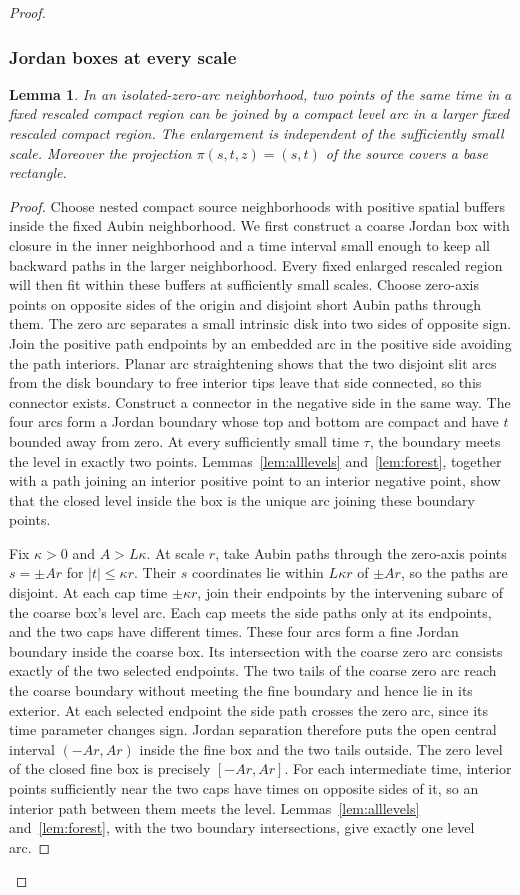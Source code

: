 \documentclass[11pt]{article}
\newtheorem{lemma}[theorem]{Lemma}
\begin{document}
\begin{proof}
\subsubsection{Jordan boxes at every scale}
\begin{lemma}\label{lem:levelboxes}
In an isolated-zero-arc neighborhood, two points of the same time in a fixed rescaled compact region can be joined by a compact level arc in a larger fixed rescaled compact region. The enlargement is independent of the sufficiently small scale. Moreover the projection $\pi(s,t,z)=(s,t)$ of the source covers a base rectangle.
\end{lemma}
\begin{proof}
Choose nested compact source neighborhoods with positive spatial buffers inside the fixed Aubin neighborhood. We first construct a coarse Jordan box with closure in the inner neighborhood and a time interval small enough to keep all backward paths in the larger neighborhood. Every fixed enlarged rescaled region will then fit within these buffers at sufficiently small scales. Choose zero-axis points on opposite sides of the origin and disjoint short Aubin paths through them. The zero arc separates a small intrinsic disk into two sides of opposite sign. Join the positive path endpoints by an embedded arc in the positive side avoiding the path interiors. Planar arc straightening shows that the two disjoint slit arcs from the disk boundary to free interior tips leave that side connected, so this connector exists. Construct a connector in the negative side in the same way. The four arcs form a Jordan boundary whose top and bottom are compact and have $t$ bounded away from zero. At every sufficiently small time $\tau$, the boundary meets the level in exactly two points. Lemmas~\ref{lem:alllevels} and~\ref{lem:forest}, together with a path joining an interior positive point to an interior negative point, show that the closed level inside the box is the unique arc joining these boundary points.

Fix $\kappa>0$ and $A>L\kappa$. At scale $r$, take Aubin paths through the zero-axis points $s=\pm Ar$ for $|t|\le\kappa r$. Their $s$ coordinates lie within $L\kappa r$ of $\pm Ar$, so the paths are disjoint. At each cap time $\pm\kappa r$, join their endpoints by the intervening subarc of the coarse box's level arc. Each cap meets the side paths only at its endpoints, and the two caps have different times. These four arcs form a fine Jordan boundary inside the coarse box. Its intersection with the coarse zero arc consists exactly of the two selected endpoints. The two tails of the coarse zero arc reach the coarse boundary without meeting the fine boundary and hence lie in its exterior. At each selected endpoint the side path crosses the zero arc, since its time parameter changes sign. Jordan separation therefore puts the open central interval $(-Ar,Ar)$ inside the fine box and the two tails outside. The zero level of the closed fine box is precisely $[-Ar,Ar]$. For each intermediate time, interior points sufficiently near the two caps have times on opposite sides of it, so an interior path between them meets the level. Lemmas~\ref{lem:alllevels} and~\ref{lem:forest}, with the two boundary intersections, give exactly one level arc.


\end{proof}
\end{proof}
\end{document}

